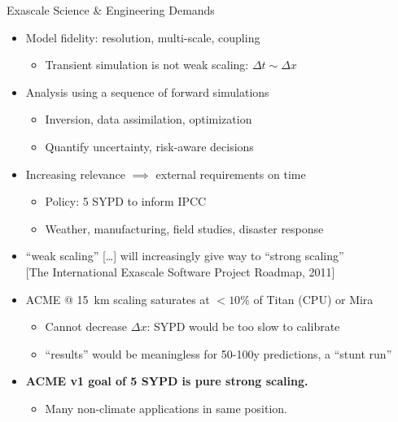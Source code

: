 \documentclass{beamer}
\begin{document}
\begin{frame}{Exascale Science \& Engineering Demands}
  \begin{itemize}
  \item Model fidelity: resolution, multi-scale, coupling
    \begin{itemize}
    \item Transient simulation is not weak scaling: $\Delta t \sim \Delta x$
    \end{itemize}
  \item Analysis using a sequence of forward simulations
    \begin{itemize}
    \item Inversion, data assimilation, optimization
    \item Quantify uncertainty, risk-aware decisions
    \end{itemize}
  \item Increasing relevance $\implies$ external requirements on time
    \begin{itemize}
    \item Policy: 5 SYPD to inform IPCC
    \item Weather, manufacturing, field studies, disaster response
    \end{itemize}
  \item ``weak scaling'' [\ldots] will increasingly give way to ``strong scaling''\\
    {\scriptsize [The International Exascale Software Project Roadmap, 2011]}
  \item ACME @ \SI{15}{\kilo\metre} scaling saturates at $<10\%$ of Titan (CPU) or Mira
    \begin{itemize}
    \item Cannot decrease $\Delta x$: SYPD would be too slow to calibrate
    \item ``results'' would be meaningless for 50-100y predictions, a ``stunt run''
    \end{itemize}
  \item \alert{\bf ACME v1 goal of 5 SYPD is pure strong scaling.}
    \begin{itemize}
    \item Many non-climate applications in same position.
    \end{itemize}
  \end{itemize}
\end{frame}
\end{document}
